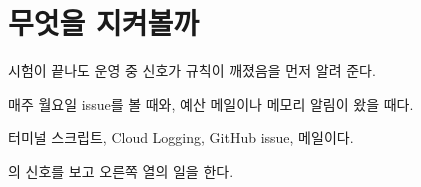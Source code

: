 
\section{무엇을 지켜볼까}\label{sec:08-watch}

\begin{inbrief}
  \item[Why] 시험이 끝나도 운영 중 신호가 규칙이 깨졌음을 먼저 알려 준다.
  \item[When] 매주 월요일 issue를 볼 때와, 예산 메일이나 메모리 알림이 왔을 때다.
  \item[Where] 터미널 스크립트, Cloud Logging, GitHub issue, 메일이다.
  \item[How] 의 신호를 보고 오른쪽 열의 일을 한다.
\end{inbrief}

